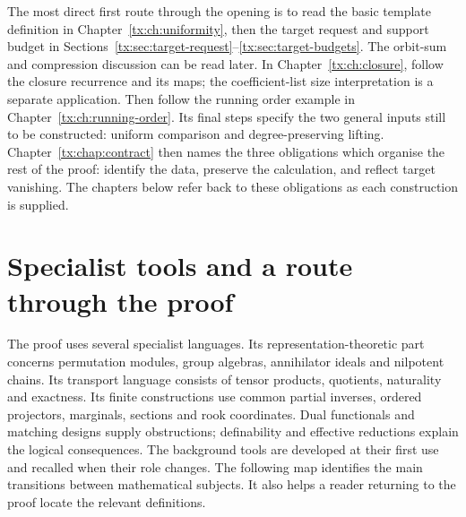 \documentclass[11pt,a4paper,oneside,openany]{book}
\theoremstyle{definition}\newtheorem{definition}[theorem]{Definition}
\theoremstyle{remark}\newtheorem{remark}[theorem]{Remark}
\numberwithin{equation}{chapter}
\begin{document}
The most direct first route through the opening is to read the basic
template definition in Chapter~\ref{tx:ch:uniformity}, then the target
request and support budget in
Sections~\ref{tx:sec:target-request}--\ref{tx:sec:target-budgets}.
The orbit-sum and compression discussion can be read later. In
Chapter~\ref{tx:ch:closure}, follow the closure recurrence and its maps;
the coefficient-list size interpretation is a separate application.
Then follow the running order example in
Chapter~\ref{tx:ch:running-order}. Its final steps specify the two
general inputs still to be constructed: uniform comparison and
degree-preserving lifting.
Chapter~\ref{tx:chap:contract} then names the three obligations which
organise the rest of the proof: identify the data, preserve the
calculation, and reflect target vanishing. The chapters below refer
back to these obligations as each construction is supplied.

\section*{Specialist tools and a route through the proof}
The proof uses several specialist languages. Its representation-theoretic
part concerns permutation modules, group algebras, annihilator ideals
and nilpotent chains. Its transport language consists of tensor products,
quotients, naturality and exactness. Its finite constructions use common
partial inverses, ordered projectors, marginals, sections and rook
coordinates. Dual functionals and matching designs supply obstructions;
definability and effective reductions explain the logical consequences.
The background tools are developed at their first use and recalled
when their role changes. The following map identifies the main
transitions between mathematical subjects. It also helps a reader
returning to the proof locate the relevant definitions.
\end{document}
